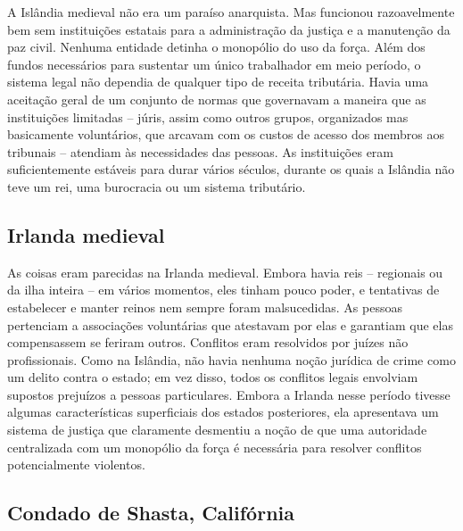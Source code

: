 A Islândia medieval não era um paraíso anarquista. Mas funcionou razoavelmente bem sem instituições estatais para a administração da justiça e a manutenção da paz civil. Nenhuma entidade detinha o monopólio do uso da força. Além dos fundos necessários para sustentar um único trabalhador em meio período, o sistema legal não dependia de qualquer tipo de receita tributária. Havia uma aceitação geral de um conjunto de normas que governavam a maneira que as instituições limitadas -- júris, assim como outros grupos, organizados mas basicamente voluntários, que arcavam com os custos de acesso dos membros aos tribunais -- atendiam às necessidades das pessoas. As instituições eram suficientemente estáveis para durar vários séculos, durante os quais a Islândia não teve um rei, uma burocracia ou um sistema tributário.

\subsection*{Irlanda medieval}

As coisas eram parecidas na Irlanda medieval. Embora havia reis -- regionais ou da ilha inteira -- em vários momentos, eles tinham pouco poder, e tentativas de estabelecer e manter reinos nem sempre foram malsucedidas. As pessoas pertenciam a associações voluntárias que atestavam por elas e garantiam que elas compensassem se feriram outros. Conflitos eram resolvidos por juízes não profissionais. Como na Islândia, não havia nenhuma noção jurídica de crime como um delito contra o estado; em vez disso, todos os conflitos legais envolviam supostos prejuízos a pessoas particulares. Embora a Irlanda nesse período tivesse algumas características superficiais dos estados posteriores, ela apresentava um sistema de justiça que claramente desmentiu a noção de que uma autoridade centralizada com um monopólio da força é necessária para resolver conflitos potencialmente violentos.

\subsection*{Condado de Shasta, Califórnia}

